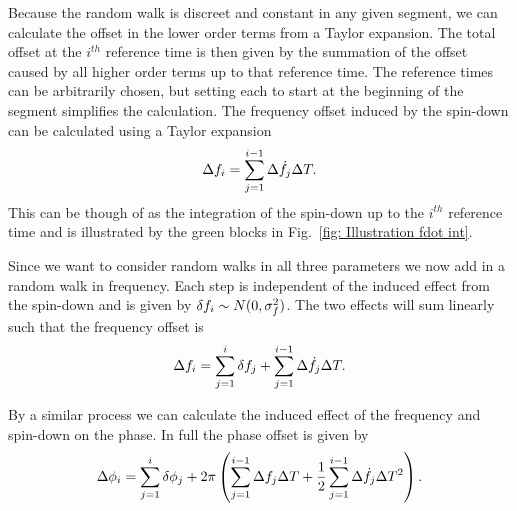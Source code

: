 Because the random walk is discreet and constant in any given segment, we can
calculate the offset in the lower order terms from a Taylor expansion. The
total offset at the  $i^{th}$ reference time is then given by the summation of
the offset caused by all higher order terms up to that reference time. The
reference times can be arbitrarily chosen, but setting each to start at the
beginning of the segment simplifies the calculation. 
The frequency offset induced by the spin-down can be
calculated using a Taylor expansion
\begin{equation}
\Delta f_{i} = \sum_{j=1}^{i-1}\Delta\dot{f}_{j} \Delta T .
\label{eqn: f offset induced} 
\end{equation}
This can be though of as the integration of the spin-down up to the $i^{th}$
reference time and is illustrated by the green blocks in Fig.~\ref{fig:
Illustration fdot int}. 

Since we want to consider random walks in all three parameters we now add in a
random walk in frequency. Each step is independent of the induced effect from
the spin-down and is given by \mbox{$\delta f_{i} \sim N(0, \sigma_{f}^{2})$}. The two
effects will sum linearly such that the frequency offset is
\begin{equation}
\Delta f_{i} = \sum_{j=1}^{i}\delta f_{j} + \sum_{j=1}^{i-1}\Delta\dot{f}_{j} \Delta T.
\label{eqn: f offset} 
\end{equation}

By a similar process we can calculate the induced effect of the frequency and
spin-down on the phase. In full the phase offset is given by
\begin{equation}
\Delta\phi_{i}  =  \sum_{j=1}^{i}\delta \phi_{j} 
+ 2\pi\left(\sum_{j=1}^{i-1}\Delta f_{j}\Delta T 
+ \frac{1}{2}\sum_{j=1}^{i-1}\Delta \dot{f}_{j}\Delta T^{2}\right).
\label{eqn: phi offset}
\end{equation}



